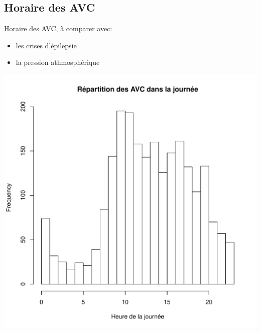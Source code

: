 \documentclass[12pt,english,french,twoside]{report}\usepackage[]{graphicx}\usepackage[]{color}
\makeatletter
\def\maxwidth{ %
  \ifdim\Gin@nat@width>\linewidth
    \linewidth
  \else
    \Gin@nat@width
  \fi
}
\newenvironment{knitrout}{}{} %
\makeatother
\begin{document}
\subsection*{Horaire des AVC}

Horaire des AVC, à comparer avec:
\begin{itemize}
  \item les crises d'épilepsie
  \item la pression athmosphérique
\end{itemize}

\begin{knitrout}
\color{fgcolor}
\includegraphics[width=\maxwidth]{figure/heure_avc1} 


\end{knitrout}
\end{document}
